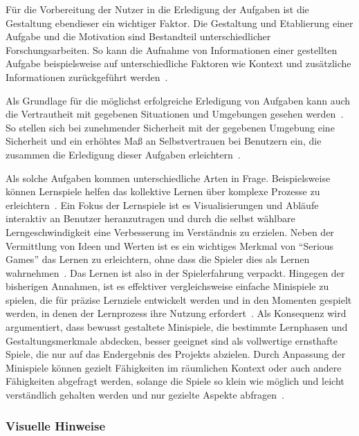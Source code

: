 Für die Vorbereitung der Nutzer in die Erledigung der Aufgaben ist die Gestaltung ebendieser ein wichtiger Faktor. Die Gestaltung und Etablierung einer Aufgabe und die Motivation sind Bestandteil unterschiedlicher Forschungsarbeiten. 
So kann die Aufnahme von Informationen einer gestellten Aufgabe beispielsweise auf unterschiedliche Faktoren wie Kontext und zusätzliche Informationen zurückgeführt werden~\cite{salancik1978social, van2002blueprints, hollnagel2003handbook}. 

Als Grundlage für die möglichst erfolgreiche Erledigung von Aufgaben kann auch die Vertrautheit mit gegebenen Situationen und Umgebungen gesehen werden~\cite{scott1966activation}. So stellen sich bei zunehmender Sicherheit mit der gegebenen Umgebung eine Sicherheit und ein erhöhtes Maß an Selbstvertrauen bei Benutzern ein, die zusammen die Erledigung dieser Aufgaben erleichtern~\cite{scott1966activation}. 

Als solche Aufgaben kommen unterschiedliche Arten in Frage. Beispielsweise können Lernspiele helfen das kollektive Lernen über komplexe Prozesse zu erleichtern~\cite{devisch2018mini, lampert2008gespielte, michael2005serious, ritterfeld2009serious}.
Ein Fokus der Lernspiele ist es Visualisierungen und Abläufe interaktiv an Benutzer heranzutragen und durch die selbst wählbare Lerngeschwindigkeit eine Verbesserung im Verständnis zu erzielen.
Neben der Vermittlung von Ideen und Werten ist es ein wichtiges Merkmal von "`Serious Games"' das Lernen zu erleichtern, ohne dass die Spieler dies als Lernen wahrnehmen~\cite{devisch2018mini, michael2005serious, ritterfeld2009serious}.
Das Lernen ist also in der Spielerfahrung verpackt.
Hingegen der bisherigen Annahmen, ist es effektiver vergleichsweise einfache Minispiele zu spielen, die für präzise Lernziele entwickelt werden und in den Momenten gespielt werden, in denen der Lernprozess ihre Nutzung erfordert~\cite{devisch2018mini}.
Als Konsequenz wird argumentiert, dass bewusst gestaltete Minispiele, die bestimmte Lernphasen und Gestaltungsmerkmale abdecken, besser geeignet sind als vollwertige ernsthafte Spiele, die nur auf das Endergebnis des Projekts abzielen. 
Durch Anpassung der Minispiele können gezielt Fähigkeiten im räumlichen Kontext oder auch andere Fähigkeiten abgefragt werden, solange die Spiele so klein wie möglich und leicht verständlich gehalten werden und nur gezielte Aspekte abfragen~\cite{devisch2018mini, michael2005serious, ritterfeld2009serious}.

\subsubsection{Visuelle Hinweise}

